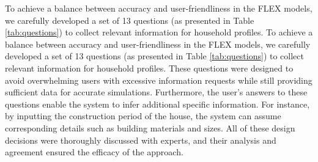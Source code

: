 To achieve a balance between accuracy and user-friendliness in the FLEX models, we carefully developed a set of 13 questions (as presented in Table \ref{tab:questions}) to collect relevant information for household profiles. To achieve a balance between accuracy and user-friendliness in the FLEX models, we carefully developed a set of 13 questions (as presented in Table \ref{tab:questions}) to collect relevant information for household profiles. 
These questions were designed to avoid overwhelming users with excessive information requests while still providing sufficient data for accurate simulations.
Furthermore, the user's answers to these questions enable the system to infer additional specific information. 
For instance, by inputting the construction period of the house, the system can assume corresponding details such as building materials and sizes.
All of these design decisions were thoroughly discussed with experts, and their analysis and agreement ensured the efficacy of the approach.

